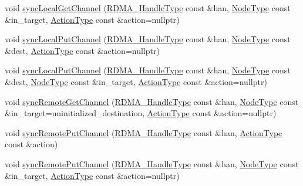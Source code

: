 \begin{DoxyCompactItemize}
\item 
void \hyperlink{structvt_1_1rdma_1_1_r_d_m_a_manager_aa38b010741db4c375e22662870549dd9}{sync\+Local\+Get\+Channel} (\hyperlink{namespacevt_a10442579ec4e7ebef223818e64bcf908}{R\+D\+M\+A\+\_\+\+Handle\+Type} const \&han, \hyperlink{namespacevt_a866da9d0efc19c0a1ce79e9e492f47e2}{Node\+Type} const \&in\+\_\+target, \hyperlink{namespacevt_ae0a5a7b18cc99d7b732cb4d44f46b0f3}{Action\+Type} const \&action=nullptr)
\item 
void \hyperlink{structvt_1_1rdma_1_1_r_d_m_a_manager_ad09037e1408af7037ca87fc4708700aa}{sync\+Local\+Put\+Channel} (\hyperlink{namespacevt_a10442579ec4e7ebef223818e64bcf908}{R\+D\+M\+A\+\_\+\+Handle\+Type} const \&han, \hyperlink{namespacevt_a866da9d0efc19c0a1ce79e9e492f47e2}{Node\+Type} const \&dest, \hyperlink{namespacevt_ae0a5a7b18cc99d7b732cb4d44f46b0f3}{Action\+Type} const \&action=nullptr)
\item 
void \hyperlink{structvt_1_1rdma_1_1_r_d_m_a_manager_a3b4e56f84f35786f8225baffeaa921ea}{sync\+Local\+Put\+Channel} (\hyperlink{namespacevt_a10442579ec4e7ebef223818e64bcf908}{R\+D\+M\+A\+\_\+\+Handle\+Type} const \&han, \hyperlink{namespacevt_a866da9d0efc19c0a1ce79e9e492f47e2}{Node\+Type} const \&dest, \hyperlink{namespacevt_a866da9d0efc19c0a1ce79e9e492f47e2}{Node\+Type} const \&in\+\_\+target, \hyperlink{namespacevt_ae0a5a7b18cc99d7b732cb4d44f46b0f3}{Action\+Type} const \&action=nullptr)
\item 
void \hyperlink{structvt_1_1rdma_1_1_r_d_m_a_manager_afaa2ab82b754c4a231c3d728fe0a9e88}{sync\+Remote\+Get\+Channel} (\hyperlink{namespacevt_a10442579ec4e7ebef223818e64bcf908}{R\+D\+M\+A\+\_\+\+Handle\+Type} const \&han, \hyperlink{namespacevt_a866da9d0efc19c0a1ce79e9e492f47e2}{Node\+Type} const \&in\+\_\+target=uninitialized\+\_\+destination, \hyperlink{namespacevt_ae0a5a7b18cc99d7b732cb4d44f46b0f3}{Action\+Type} const \&action=nullptr)
\item 
void \hyperlink{structvt_1_1rdma_1_1_r_d_m_a_manager_a9b6fb7fac7c6b534659705cf4ad20658}{sync\+Remote\+Put\+Channel} (\hyperlink{namespacevt_a10442579ec4e7ebef223818e64bcf908}{R\+D\+M\+A\+\_\+\+Handle\+Type} const \&han, \hyperlink{namespacevt_ae0a5a7b18cc99d7b732cb4d44f46b0f3}{Action\+Type} const \&action)
\item 
void \hyperlink{structvt_1_1rdma_1_1_r_d_m_a_manager_aae382995709cd7827f256f9d5f3e45e4}{sync\+Remote\+Put\+Channel} (\hyperlink{namespacevt_a10442579ec4e7ebef223818e64bcf908}{R\+D\+M\+A\+\_\+\+Handle\+Type} const \&han, \hyperlink{namespacevt_a866da9d0efc19c0a1ce79e9e492f47e2}{Node\+Type} const \&in\+\_\+target, \hyperlink{namespacevt_ae0a5a7b18cc99d7b732cb4d44f46b0f3}{Action\+Type} const \&action=nullptr)

\end{DoxyCompactItemize}
